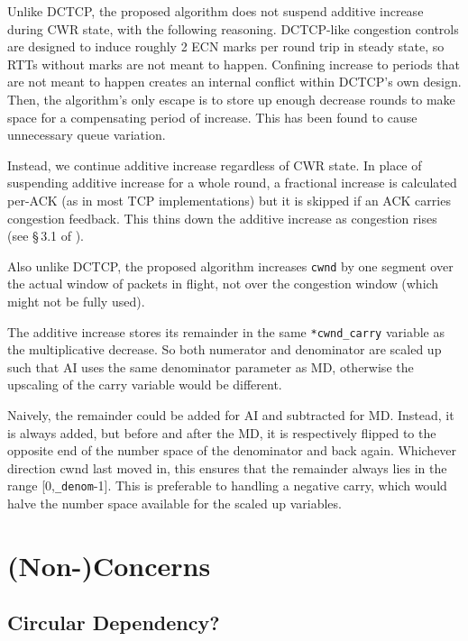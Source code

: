 Unlike DCTCP, the proposed algorithm does not suspend additive increase during
CWR state, with the following reasoning. DCTCP-like congestion controls are
designed to induce roughly 2 ECN marks per round trip in steady state, so RTTs
without marks are not meant to happen. Confining increase to periods that are
not meant to happen creates an internal conflict within DCTCP's own design.
Then, the algorithm's only escape is to store up enough decrease rounds to make
space for a compensating period of increase. This has been found to cause
unnecessary queue variation.

Instead, we continue additive increase regardless of CWR state. In place of
suspending additive increase for a whole round, a fractional increase is
calculated per-ACK (as in most TCP implementations) but it is skipped if an ACK
carries congestion feedback. This thins down the additive increase as congestion
rises (see \S\,3.1 of \cite{Briscoe17a:CC_Tensions_TR}).

Also unlike DCTCP, the proposed algorithm increases \texttt{cwnd} by one segment
over the actual window of packets in flight, not over the congestion window
(which might not be fully used).

The additive increase stores its remainder in the same \texttt{*cwnd\_carry}
variable as the multiplicative decrease. So both numerator and denominator are
scaled up such that AI uses the same denominator parameter as MD, otherwise the
upscaling of the carry variable would be different.

Naively, the remainder could be added for AI and subtracted for MD. Instead, it is always added, but before and after the MD, it is respectively flipped to the opposite end of the number space of the denominator and back again. Whichever direction cwnd last moved in, this ensures that the remainder always lies in the range [0,\texttt{\_denom}-1].
This is preferable to handling a negative carry, which would halve the number
space available for the scaled up variables.

\section{(Non-)Concerns}\label{prresp_Non-Concerns}

\subsection{Circular Dependency?}\label{prresp_No_Circular_Dependency}

